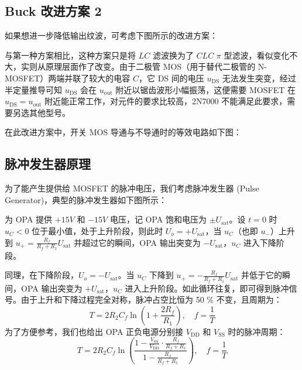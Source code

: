 \documentclass[UTF8]{report}
\theoremstyle{MyLineTheoremStyle} %
\theoremstyle{MyBlockTheoremStyle} %
\theoremstyle{MySubsubsectionStyle} %
\begin{document}
\subsection{Buck 改进方案 2}
如果想进一步降低输出纹波，可考虑下图所示的改进方案：
\begin{figure}[H]\centering
    \caption{}
\end{figure}
与第一种方案相比，这种方案只是将 $LC$ 滤波换为了 $CLC$ $\pi$ 型滤波，看似变化不大，实则从原理层面作了改变。由于二极管 MOS（用于替代二极管的 N-MOSFET）两端并联了较大的电容 $C$，它 DS 间的电压 $u_{\text{DS}}$ 无法发生突变，经过半定量推导可知 $u_{\text{DS}}$ 会在 $u_{\text{out}}$ 附近以锯齿波形小幅振荡，这便需要 MOSFET 在  $u_{\text{DS}} = u_{\text{out}}$ 附近能正常工作，对元件的要求比较高，2N7000 不能满足此要求，需要另选其他型号。



在此改进方案中，开关 MOS 导通与不导通时的等效电路如下图：

\subsection{脉冲发生器原理}
为了能产生提供给 MOSFET 的脉冲电压，我们考虑脉冲发生器 (Pulse Generator)，典型的脉冲发生器如下图所示：
\begin{figure}[H]\centering
    \caption{}
\end{figure}
为 OPA 提供 $+15 V$ 和 $-15 V$ 电压，记 OPA 饱和电压为 $\pm U_{\text{sat}}$。设 $t = 0$ 时 $u_C < 0$ 位于最小值，处于上升阶段，则此时 $U_o = +U_{\text{sat}}$，当 $u_C$（也即 $u_-$）上升到 $u_+ = \frac{R_f}{R_f + R_1}U_{\text{sat}}$ 并超过它的瞬间，OPA 输出突变为 $-U_{\text{sat}}$，$u_C$ 进入下降阶段。

同理，在下降阶段，$U_o = -U_{\text{sat}}$。当 $u_C$ 下降到 $u_+ = -\frac{R_f}{R_f + R_1}U_{\text{sat}}$ 并低于它的瞬间，OPA 输出突变为 $+U_{\text{sat}}$，$u_C$ 进入上升阶段。如此循环往复，即可得到脉冲信号。由于上升和下降过程完全对称，脉冲占空比恒为 50 \% 不变，且周期为：
\begin{equation}
T = 2R_2 C_f \ln \left( 1 + \frac{2R_f}{R_1} \right),\quad f = \frac{1}{T}
\end{equation}
为了方便参考，我们也给出 OPA 正负电源分别接 $V_{\text{DD}}$ 和 $V_{\text{SS}}$ 时的脉冲周期：
\begin{equation}
T = 2R_2 C_f \ln \left( \frac{1 - \frac{V_{\text{SS}}}{V_{\text{DD}}}\cdot \frac{R_f}{R_f + R_1}}{1 - \frac{R_f}{R_f + R_1}} \right),\quad f = \frac{1}{T}
\end{equation}
\end{document}
